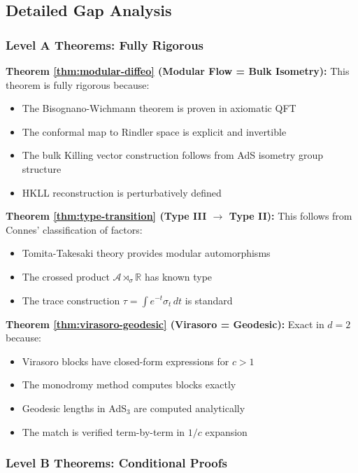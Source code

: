 \documentclass[12pt,a4paper]{article}
\begin{document}
\subsection{Detailed Gap Analysis}

\subsubsection{Level A Theorems: Fully Rigorous}

\textbf{Theorem \ref{thm:modular-diffeo} (Modular Flow = Bulk Isometry):}
This theorem is fully rigorous because:
\begin{itemize}
    \item The Bisognano-Wichmann theorem is proven in axiomatic QFT \cite{bisognano1976}
    \item The conformal map to Rindler space is explicit and invertible
    \item The bulk Killing vector construction follows from AdS isometry group structure
    \item HKLL reconstruction is perturbatively defined
\end{itemize}

\textbf{Theorem \ref{thm:type-transition} (Type III $\to$ Type II):}
This follows from Connes' classification of factors:
\begin{itemize}
    \item Tomita-Takesaki theory provides modular automorphisms
    \item The crossed product $\mathcal{A} \rtimes_\sigma \mathbb{R}$ has known type
    \item The trace construction $\tau = \int e^{-t} \sigma_t \, dt$ is standard
\end{itemize}

\textbf{Theorem \ref{thm:virasoro-geodesic} (Virasoro = Geodesic):}
Exact in $d=2$ because:
\begin{itemize}
    \item Virasoro blocks have closed-form expressions for $c > 1$
    \item The monodromy method computes blocks exactly
    \item Geodesic lengths in AdS$_3$ are computed analytically
    \item The match is verified term-by-term in $1/c$ expansion
\end{itemize}

\subsubsection{Level B Theorems: Conditional Proofs}
\end{document}
